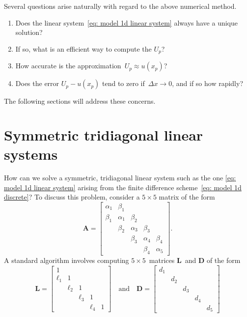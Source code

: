 Several questions arise naturally with regard to the above numerical method.
\begin{enumerate}
\item Does the linear system~\eqref{eq: model 1d linear system} always have a 
unique solution?
\item If so, what is an efficient way to compute the $U_p$?
\item How accurate is the approximation~$U_p\approx u(x_p)$?
\item Does the error $U_p-u(x_p)$ tend to zero if~$\Delta x\to0$, and if so how 
rapidly?
\end{enumerate}
The following sections will address these concerns.

\section{Symmetric tridiagonal linear systems}
\label{sec: sym tridiagonal}
How can we solve a symmetric, tridiagonal linear system such as the one
\eqref{eq: model 1d linear system} arising from the finite difference 
scheme~\eqref{eq: model 1d discrete}?  To discuss this problem, consider a 
$5\times5$ matrix of the form
\begin{equation}\label{eq: A symm tridiagonal}
\boldsymbol{A}=\begin{bmatrix}
\alpha_1& \beta_1&        &        &\\
 \beta_1&\alpha_1& \beta_2&        &\\
        & \beta_2&\alpha_3&\beta_3 &\\
        &        & \beta_3&\alpha_4&\beta_4\\
        &        &        & \beta_4&\alpha_5
\end{bmatrix}.
\end{equation}
A standard algorithm involves computing $5\times5$~matrices 
$\boldsymbol{L}$~and $\boldsymbol{D}$ of the form
\[
\boldsymbol{L}=\begin{bmatrix}
     1&      &      &      &\\
\ell_1&     1&      &      &\\
      &\ell_2&     1&      &\\
      &      &\ell_3&     1&\\
      &      &      &\ell_4&1
  \end{bmatrix}
\quad\text{and}\quad
\boldsymbol{D}=\begin{bmatrix}
d_1&   &   &   &\\
   &d_2&   &   &\\
   &   &d_3&   &\\
   &   &   &d_4&\\
   &   &   &   &d_5
  \end{bmatrix}
\]
